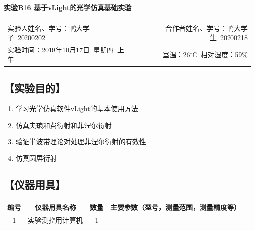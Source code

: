 \documentclass[12pt,a4paper,UTF8,fontset=fandol]{ctexart}
\begin{document}

\begin{center}
\LARGE\textbf{实验B16 基于vLight的光学仿真基础实验}
\end{center}

\begin{doublespacing}
	\centering
	\begin{tabular}{lr}
	 & \\
	 {实验人姓名、学号：鸭大学子~20200202} & {合作者姓名、学号：鸭大学生~20200218}\\
	 {实验时间：2019年10月17日~星期四~上午} & {室温：26$^{\circ}$C~相对湿度：59\%}
	\end{tabular}
\end{doublespacing}



\subsection*{【实验目的】}
	\begin{enumerate}[(1)]
		\item 学习光学仿真软件vLight的基本使用方法
		\item 仿真夫琅和费衍射和菲涅尔衍射
		\item 验证半波带理论对处理菲涅尔衍射的有效性
		\item 仿真圆屏衍射
	\end{enumerate}

\subsection*{【仪器用具】}


	\begin{table}[htbp]
	  \centering
	    \begin{tabular}{cccp{20em}}
	    \toprule
	    编号    & 仪器用具名称 & 数量    & 主要参数（型号，测量范围，测量精度等） \\
	    \midrule
	    1     & 实验测控用计算机 & 1     &  \\
	    \bottomrule
	    \end{tabular}%
	  \label{tab:device}%
	\end{table}%
\end{document}

